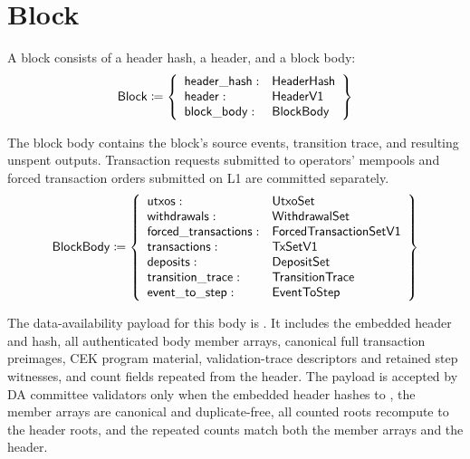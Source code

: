 \documentclass[../midgard.tex]{subfiles}
\begin{document}
\section{Block}
\label{h:block}

A block consists of a header hash, a header, and a block body:
\begin{equation*}
    \mathsf{Block} \coloneq \left\{
    \begin{array}{ll}
        \mathsf{header\_hash} : & \mathsf{HeaderHash} \\
        \mathsf{header} : & \mathsf{HeaderV1} \\
        \mathsf{block\_body} : & \mathsf{BlockBody}
    \end{array} \right\}
\end{equation*}

The block body contains the block's source events, transition trace, and resulting unspent outputs.
Transaction requests submitted to operators' mempools and forced transaction orders submitted on L1 are committed separately.
\begin{equation*}
    \mathsf{BlockBody} \coloneq \left\{
    \begin{array}{ll}
        \mathsf{utxos} : & \mathsf{UtxoSet} \\
        \mathsf{withdrawals} : & \mathsf{WithdrawalSet} \\
        \mathsf{forced\_transactions} : & \mathsf{ForcedTransactionSetV1} \\
        \mathsf{transactions} : & \mathsf{TxSetV1} \\
        \mathsf{deposits} : & \mathsf{DepositSet} \\
        \mathsf{transition\_trace} : & \mathsf{TransitionTrace} \\
        \mathsf{event\_to\_step} : & \mathsf{EventToStep} \\
    \end{array} \right\}
\end{equation*}

The data-availability payload for this body is . It
includes the embedded header and hash, all authenticated body member arrays,
canonical full transaction preimages, CEK program material,
validation-trace descriptors and retained step witnesses, and count fields repeated from the header.
The payload is accepted by DA committee validators only when the embedded header hashes to , the member arrays are canonical and duplicate-free, all counted roots recompute to the header roots, and the repeated counts match both the member arrays and the header.
\end{document}
